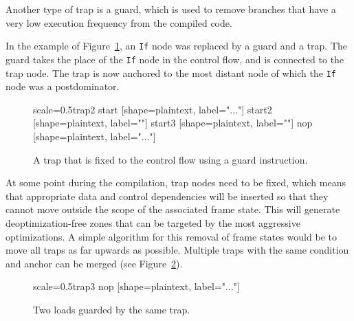 \documentclass[twocolumn]{svjour3}
\begin{document}
Another type of trap is a guard, which is used to remove branches that have a very low execution frequency from the compiled code.

In the example of Figure~\ref{fig:trap2}, an \texttt{If} node was replaced by a guard and a trap.
The guard takes the place of the \texttt{If} node in the control flow, and is connected to the trap node.
The trap is now anchored to the most distant node of which the \texttt{If} node was a postdominator.

\begin{figure}[h]
  \label{fig:trap2}
  \centering
\begin{digraphenv}{scale=0.5}{trap2}
    start [shape=plaintext, label="..."]
    start2 [shape=plaintext, label=""]
    start3 [shape=plaintext, label=""]
    nop [shape=plaintext, label="..."]
\end{digraphenv}
  \caption{A trap that is fixed to the control flow using a guard instruction.}
\end{figure}

At some point during the compilation, trap nodes need to be fixed, which means that appropriate data and control dependencies will be inserted so that they cannot move outside the scope of the associated frame state.
This will generate deoptimization-free zones that can be targeted by the most aggressive optimizations.
A simple algorithm for this removal of frame states would be to move all traps as far upwards as possible.
Multiple traps with the same condition and anchor can be merged (see Figure~\ref{fig:trap3}).

\begin{figure}[h]
  \label{fig:trap3}
  \centering
\begin{digraphenv}{scale=0.5}{trap3}
    nop [shape=plaintext, label="..."]
\end{digraphenv}
  \caption{Two loads guarded by the same trap.}
\end{figure}
\end{document}
